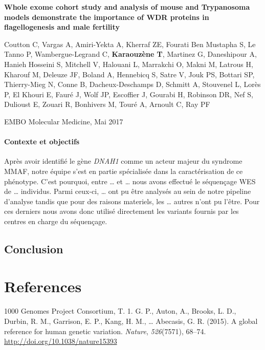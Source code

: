 \documentclass[12pt,twoside]{reedthesis}
\theoremstyle{definition}
\theoremstyle{definition}
\theoremstyle{remark}
\begin{document}
  \textbf{Whole exome cohort study and analysis of mouse and Trypanosoma
  models demonstrate the importance of WDR proteins in flagellogenesis and
  male fertility}
  
  Coutton C, Vargas A, Amiri-Yekta A, Kherraf ZE, Fourati Ben Mustapha S,
  Le Tanno P, Wambergue-Legrand C, \textbf{Karaouzène T}, Martinez G,
  Daneshipour A, Hanieh Hosseini S, Mitchell V, Halouani L, Marrakchi O,
  Makni M, Latrous H, Kharouf M, Deleuze JF, Boland A, Hennebicq S, Satre
  V, Jouk PS, Bottari SP, Thierry-Mieg N, Conne B, Dacheux-Deschamps D,
  Schmitt A, Stouvenel L, Lorès P, El Khouri E, Fauré J, Wolf JP,
  Escoffier J, Gourabi H, Robinson DR, Nef S, Dulioust E, Zouari R,
  Bonhivers M, Touré A, Arnoult C, Ray PF
  
  EMBO Molecular Medicine, Mai 2017
  
  \newpage
  
  \subsubsection{Contexte et objectifs}\label{contexte-et-objectifs-4}
  
  Après avoir identifié le gène \emph{DNAH1} comme un acteur majeur du
  syndrome MMAF, notre équipe s'est en partie spécialisée dans la
  caractérisation de ce phénotype. C'est pourquoi, entre \ldots{} et
  \ldots{} nous avons effectué le séquençage WES de \ldots{} individus.
  Parmi ceux-ci, \ldots{} ont pu être analysés au sein de notre pipeline
  d'analyse tandis que pour des raisons materiels, les \ldots{} autres
  n'ont pu l'être. Pour ces derniers nous avons donc utilisé directement
  les variants fournis par les centres en charge du séquençage.
  
  \newpage
  
  
  
  \newpage
  
  \section{Conclusion}\label{conclusion}
  
  \chapter*{References}\label{references}
  
  \hypertarget{refs}{}
  \hypertarget{ref-1000GenomesProjectConsortium2015}{}
  1000 Genomes Project Consortium, T. 1. G. P., Auton, A., Brooks, L. D.,
  Durbin, R. M., Garrison, E. P., Kang, H. M., \ldots{} Abecasis, G. R.
  (2015). A global reference for human genetic variation. \emph{Nature},
  \emph{526}(7571), 68--74. \url{http://doi.org/10.1038/nature15393}
  
\end{document}
